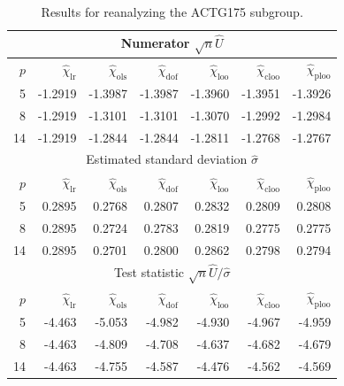 \begin{table}[htbp]
\centering\small
\caption{Results for reanalyzing the ACTG175 subgroup.}
\label{tab:actg175-application}
\setlength{\tabcolsep}{5pt}
\renewcommand{\arraystretch}{1.05}
\begin{tabular}{@{}rrrrrrr@{}}
\toprule
\multicolumn{7}{c}{Numerator $\sqrt{n}\widehat U$} \\
\midrule
$p$ & $\widehat\chi_{\mathrm{lr}}$ & $\widehat\chi_{\mathrm{ols}}$ & $\widehat\chi_{\mathrm{dof}}$ & $\widehat\chi_{\mathrm{loo}}$ & $\widehat\chi_{\mathrm{cloo}}$ & $\widehat\chi_{\mathrm{ploo}}$ \\
\midrule
5 & -1.2919 & -1.3987 & -1.3987 & -1.3960 & -1.3951 & -1.3926 \\
8 & -1.2919 & -1.3101 & -1.3101 & -1.3070 & -1.2992 & -1.2984 \\
14 & -1.2919 & -1.2844 & -1.2844 & -1.2811 & -1.2768 & -1.2767 \\
\midrule
\multicolumn{7}{c}{Estimated standard deviation $\widehat\sigma$} \\
\midrule
$p$ & $\widehat\chi_{\mathrm{lr}}$ & $\widehat\chi_{\mathrm{ols}}$ & $\widehat\chi_{\mathrm{dof}}$ & $\widehat\chi_{\mathrm{loo}}$ & $\widehat\chi_{\mathrm{cloo}}$ & $\widehat\chi_{\mathrm{ploo}}$ \\
\midrule
5 & 0.2895 & 0.2768 & 0.2807 & 0.2832 & 0.2809 & 0.2808 \\
8 & 0.2895 & 0.2724 & 0.2783 & 0.2819 & 0.2775 & 0.2775 \\
14 & 0.2895 & 0.2701 & 0.2800 & 0.2862 & 0.2798 & 0.2794 \\
\midrule
\multicolumn{7}{c}{Test statistic $\sqrt{n}\widehat U/\widehat\sigma$} \\
\midrule
$p$ & $\widehat\chi_{\mathrm{lr}}$ & $\widehat\chi_{\mathrm{ols}}$ & $\widehat\chi_{\mathrm{dof}}$ & $\widehat\chi_{\mathrm{loo}}$ & $\widehat\chi_{\mathrm{cloo}}$ & $\widehat\chi_{\mathrm{ploo}}$ \\
\midrule
5 & -4.463 & -5.053 & -4.982 & -4.930 & -4.967 & -4.959 \\
8 & -4.463 & -4.809 & -4.708 & -4.637 & -4.682 & -4.679 \\
14 & -4.463 & -4.755 & -4.587 & -4.476 & -4.562 & -4.569 \\
\bottomrule
\end{tabular}
\end{table}
